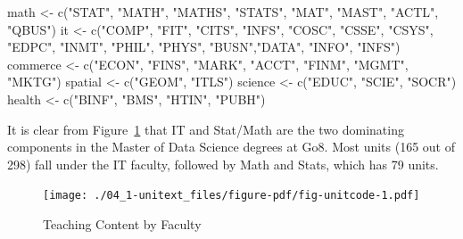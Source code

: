 \documentclass[
  letterpaper,
  DIV=11,
  numbers=noendperiod]{scrreport}
\newenvironment{Shaded}{\begin{snugshade}}{\end{snugshade}}
\newcommand{\FunctionTok}[1]{\textcolor[rgb]{0.28,0.35,0.67}{#1}}
\newcommand{\NormalTok}[1]{\textcolor[rgb]{0.00,0.23,0.31}{#1}}
\newcommand{\OtherTok}[1]{\textcolor[rgb]{0.00,0.23,0.31}{#1}}
\newcommand{\StringTok}[1]{\textcolor[rgb]{0.13,0.47,0.30}{#1}}
\begin{document}
\begin{Shaded}
\begin{Highlighting}[]
\NormalTok{math }\OtherTok{\textless{}{-}} \FunctionTok{c}\NormalTok{(}\StringTok{"STAT"}\NormalTok{, }\StringTok{"MATH"}\NormalTok{, }\StringTok{"MATHS"}\NormalTok{, }\StringTok{"STATS"}\NormalTok{, }\StringTok{"MAT"}\NormalTok{, }\StringTok{"MAST"}\NormalTok{, }\StringTok{"ACTL"}\NormalTok{, }\StringTok{"QBUS"}\NormalTok{)}
\NormalTok{it }\OtherTok{\textless{}{-}} \FunctionTok{c}\NormalTok{(}\StringTok{"COMP"}\NormalTok{, }\StringTok{"FIT"}\NormalTok{, }\StringTok{"CITS"}\NormalTok{, }\StringTok{"INFS"}\NormalTok{, }\StringTok{"COSC"}\NormalTok{, }\StringTok{"CSSE"}\NormalTok{, }\StringTok{"CSYS"}\NormalTok{, }\StringTok{"EDPC"}\NormalTok{, }\StringTok{"INMT"}\NormalTok{, }\StringTok{"PHIL"}\NormalTok{, }\StringTok{"PHYS"}\NormalTok{, }\StringTok{"BUSN"}\NormalTok{,}\StringTok{"DATA"}\NormalTok{, }\StringTok{"INFO"}\NormalTok{, }\StringTok{"INFS"}\NormalTok{)}
\NormalTok{commerce }\OtherTok{\textless{}{-}} \FunctionTok{c}\NormalTok{(}\StringTok{"ECON"}\NormalTok{, }\StringTok{"FINS"}\NormalTok{, }\StringTok{"MARK"}\NormalTok{, }\StringTok{"ACCT"}\NormalTok{, }\StringTok{"FINM"}\NormalTok{, }\StringTok{"MGMT"}\NormalTok{, }\StringTok{"MKTG"}\NormalTok{)}
\NormalTok{spatial }\OtherTok{\textless{}{-}} \FunctionTok{c}\NormalTok{(}\StringTok{"GEOM"}\NormalTok{, }\StringTok{"ITLS"}\NormalTok{)}
\NormalTok{science }\OtherTok{\textless{}{-}} \FunctionTok{c}\NormalTok{(}\StringTok{"EDUC"}\NormalTok{, }\StringTok{"SCIE"}\NormalTok{, }\StringTok{"SOCR"}\NormalTok{)}
\NormalTok{health }\OtherTok{\textless{}{-}} \FunctionTok{c}\NormalTok{(}\StringTok{"BINF"}\NormalTok{, }\StringTok{"BMS"}\NormalTok{, }\StringTok{"HTIN"}\NormalTok{, }\StringTok{"PUBH"}\NormalTok{)}
\end{Highlighting}
\end{Shaded}

It is clear from Figure~\ref{fig-unitcode} that IT and Stat/Math are the
two dominating components in the Master of Data Science degrees at Go8.
Most units (165 out of 298) fall under the IT faculty, followed by Math
and Stats, which has 79 units.

\begin{figure}

{\centering \texttt{[image: ./04\_1-unitext\_files/figure-pdf/fig-unitcode-1.pdf]}

}

\caption{\label{fig-unitcode}Teaching Content by Faculty}

\end{figure}
\end{document}
